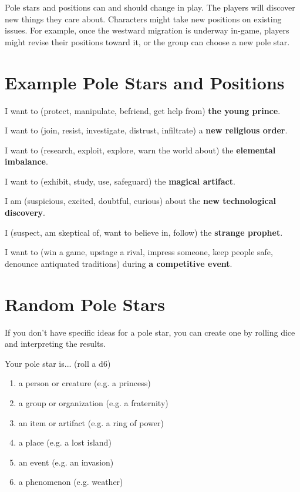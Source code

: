 \documentclass[10pt,oneside,letterpaper,landscape]{memoir}
\begin{document}
\begin{multicols}{3}
Pole stars and positions can and should change in play. The players will discover new things they care about. Characters might take new positions on existing issues. For example, once the westward migration is underway in-game, players might revise their positions toward it, or the group can choose a new pole star.

\vfill\null %

\columnbreak

\section{Example Pole Stars and Positions}

I want to (protect, manipulate, befriend, get help from) \textbf{the young prince}.

I want to (join, resist, investigate, distrust, infiltrate) a \textbf{new religious order}.

I want to (research, exploit, explore, warn the world about) the \textbf{elemental imbalance}.

I want to (exhibit, study, use, safeguard) the \textbf{magical artifact}.

I am (suspicious, excited, doubtful, curious) about the \textbf{new technological discovery}.

I (suspect, am skeptical of, want to believe in, follow) the \textbf{strange prophet}.

I want to (win a game, upstage a rival, impress someone, keep people safe, denounce antiquated traditions) during \textbf{a competitive event}.

\section{Random Pole Stars}

If you don't have specific ideas for a pole star, you can create one by rolling dice and interpreting the results.

Your pole star is... (roll a d6)

\begin{enumerate}
\item [1:] a person or creature (e.g. a princess)
\item [2:] a group or organization (e.g. a fraternity)
\item [3:] an item or artifact (e.g. a ring of power)
\item [4:] a place (e.g. a lost island)
\item [5:] an event (e.g. an invasion)
\item [6:] a phenomenon (e.g. weather)
\end{enumerate}


\end{multicols}
\end{document}
